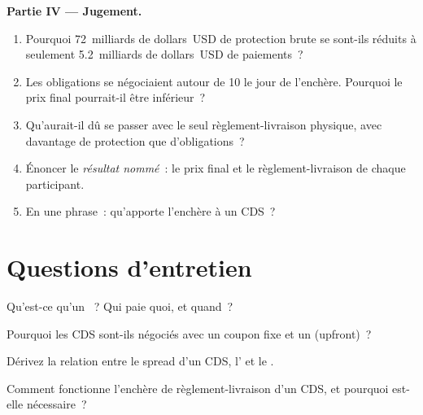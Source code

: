 \begin{problem}
\medskip\noindent\textbf{Partie IV --- Jugement.}
\begin{enumerate}[resume]
\item Pourquoi 72~milliards de dollars~USD de protection brute se sont-ils réduits à seulement
5.2~milliards de dollars~USD de paiements~?
\item Les obligations se négociaient autour de 10 le jour de l'enchère. Pourquoi le prix final
pourrait-il être inférieur~?
\item Qu'aurait-il dû se passer avec le seul règlement-livraison physique, avec davantage de protection
que d'obligations~?
\item Énoncer le \emph{résultat nommé}~: le prix final et le règlement-livraison de chaque
participant.
\item En une phrase~: qu'apporte l'enchère à un CDS~?
\end{enumerate}
\end{problem}

\section{Questions d'entretien}

\begin{interviewq}\label{iq:m2:credit-default-swaps:1}
Qu'est-ce qu'un ~? Qui paie quoi, et quand~?
\end{interviewq}

\begin{interviewq}\label{iq:m2:credit-default-swaps:2}
Pourquoi les CDS sont-ils négociés avec un coupon fixe et un  (upfront)~?
\end{interviewq}

\begin{interviewq}\label{iq:m2:credit-default-swaps:3}
Dérivez la relation entre le spread d'un CDS, l' et le .
\end{interviewq}

\begin{interviewq}\label{iq:m2:credit-default-swaps:4}
Comment fonctionne l'enchère de règlement-livraison d'un CDS, et pourquoi est-elle nécessaire~?
\end{interviewq}


